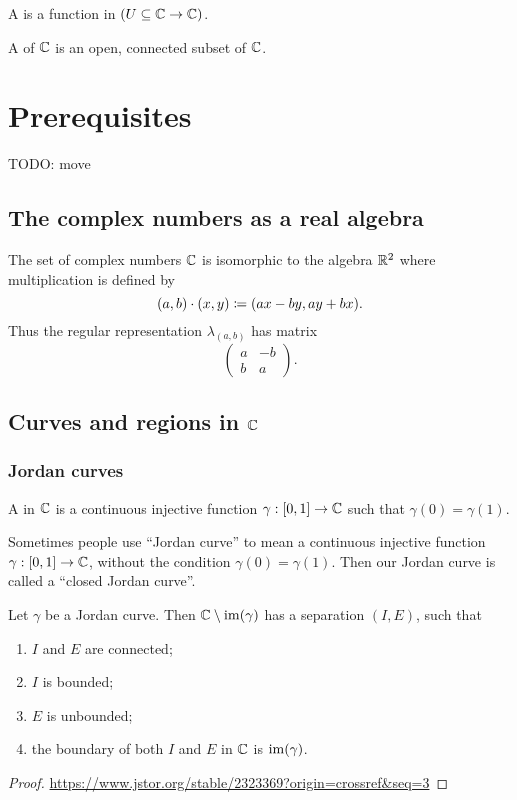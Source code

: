 \begin{definition}
A  is a function in $(U\subseteq \mathbb{C} \to \mathbb{C})$.

A  of $\mathbb{C}$ is an open, connected subset of $\mathbb{C}$.
\end{definition}

\section{Prerequisites}
TODO: move
\subsection{The complex numbers as a real algebra}
The set of complex numbers $\mathbb{C}$ is isomorphic to the algebra $\mathbb{R}^2$ where multiplication is defined by
\[ (a, b)\cdot (x, y) \coloneqq (ax-by, ay+bx). \]
Thus the regular representation $\lambda_{(a,b)}$ has matrix
\[ \begin{pmatrix}
a & -b \\ b & a
\end{pmatrix}. \]

\subsection{Curves and regions in $\mathbb{C}$}
\subsubsection{Jordan curves}
\begin{definition}
A  in $\mathbb{C}$ is a continuous injective function $\gamma: \interval{0,1}\to \C$ such that $\gamma(0) = \gamma(1)$.
\end{definition}
Sometimes people use ``Jordan curve'' to mean a continuous injective function $\gamma: \interval{0,1}\to \C$, without the condition $\gamma(0) = \gamma(1)$. Then our Jordan curve is called a ``closed Jordan curve''.

\begin{theorem}
Let $\gamma$ be a Jordan curve. Then $\mathbb{C}\setminus\operatorname{im}(\gamma)$ has a separation $(I,E)$, such that
\begin{enumerate}
\item $I$ and $E$ are connected;
\item $I$ is bounded;
\item $E$ is unbounded;
\item the boundary of both $I$ and $E$ in $\mathbb{C}$ is $\operatorname{im}(\gamma)$.
\end{enumerate}
\end{theorem}
\begin{proof}
\url{https://www.jstor.org/stable/2323369?origin=crossref&seq=3}
\end{proof}


